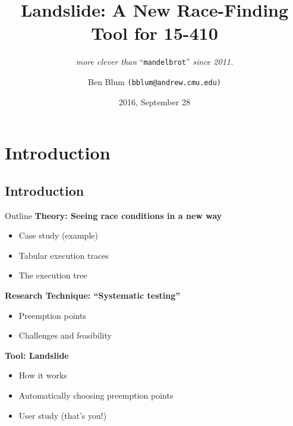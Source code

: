 \documentclass[xcolor=dvipsnames]{beamer}
\title[Landslide]{{\bf Landslide: A New Race-Finding Tool for 15-410}}
\subtitle[]{ {\em more clever than } ``\texttt{mandelbrot}'' {\em since 2011.}}
\author[Ben Blum]{Ben Blum \texttt{(bblum@andrew.cmu.edu)}}
\institute[CMU 15-410]{Carnegie Mellon University - 15-410}
\date[]{2016, September 28}
\begin{document}
\renewcommand{\inserttotalframenumber}{39}
\normalem
\begin{frame}
	\titlepage
\end{frame}


\newcommand\linegap{\vspace{0.2in}}
\newcommand\breakslide[1]{\begin{frame}{} \begin{center} #1 \end{center} \end{frame}}

\section{Introduction}
\subsection{Introduction}

\begin{frame}{Outline}
	\textbf{Theory: Seeing race conditions in a new way}
	\begin{itemize}
		\item Case study (example)
		\item Tabular execution traces
		\item The execution tree
	\end{itemize}
	{\bf Research Technique: ``Systematic testing''}
	\begin{itemize}
		\item Preemption points
		\item Challenges and feasibility
	\end{itemize}
	{\bf Tool: Landslide}
	\begin{itemize}
		\item How it works
		\item Automatically choosing preemption points
		\item User study (that's you!)
	\end{itemize}
\end{frame}
\end{document}
